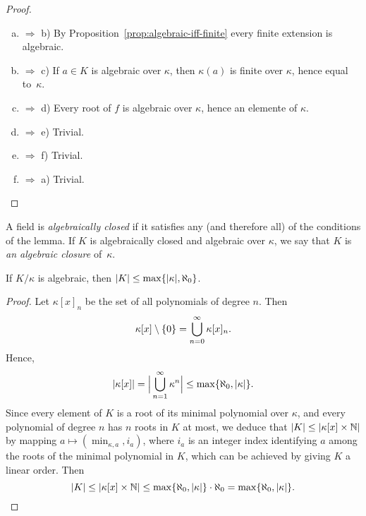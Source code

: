 \begin{proof}${}$
    \begin{enumerate}[a), font=\upshape]
        \item $\Rightarrow$ b) By Proposition~\ref{prop:algebraic-iff-finite} every finite extension is algebraic.

        \item $\Rightarrow$ c) If $a\in K$ is algebraic over $\kappa$, then $\kappa(a)$ is finite over $\kappa$, hence equal to~$\kappa$.

        \item $\Rightarrow$ d) Every root of $f$ is algebraic over $\kappa$, hence an elemente of $\kappa$.

        \item $\Rightarrow$ e) Trivial.

        \item $\Rightarrow$ f) Trivial.

        \item $\Rightarrow$ a) Trivial.
    \end{enumerate}
\end{proof}

\begin{defn}
    A field is \textsl{algebraically closed} if it satisfies any (and therefore all) of the conditions of the lemma. If $K$ is algebraically closed and algebraic over $\kappa$, we say that $K$ is \textsl{an algebraic closure} of~$\kappa$.
\end{defn}

\begin{lem}
    If\/ $K/\kappa$ is algebraic, then\/ $|K|\le\max\{|\kappa|,\aleph_0\}$. 
\end{lem}

\begin{proof}
    Let $\kappa[x]_n$ be the set of all polynomials of degree $n$. Then
    $$
        \kappa[x]\setminus\{0\}
            =\bigcup_{n=0}^\infty\kappa[x]_n.
    $$
    Hence,
    $$
        |\kappa[x]|
            =\Big|\bigcup_{n=1}^\infty\kappa^n\Big|
            \le\max\{\aleph_0,|\kappa|\}.
    $$
    Since every element of $K$ is a root of its minimal polynomial over $\kappa$, and every polynomial of degree $n$ has $n$ roots in $K$ at most, we deduce that $|K|\le |\kappa[x]\times\mathbb{N}|$ by mapping $a\mapsto(\min_{\kappa,a},i_a)$, where $i_a$ is an integer index identifying $a$ among the roots of the minimal polynomial in $K$, which can be achieved by giving $K$ a linear order. Then
    $$
        |K|\le |\kappa[x]\times\mathbb{N}|
            \le\max\{\aleph_0,|\kappa|\}\cdot\aleph_0
            =\max\{\aleph_0,|\kappa|\}.
    $$
\end{proof}

